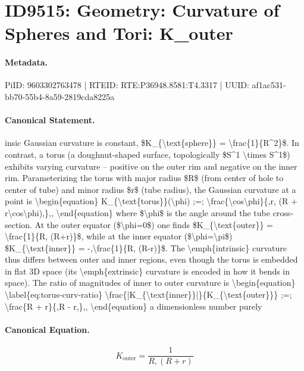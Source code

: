 \section*{ID9515: Geometry: Curvature of Spheres and Tori: K\_outer}
\paragraph{Metadata.}
PiID: 9603302763478 | RTEID: RTE:P36948.8581:T4.3317 | UUID: af1ac531-bb70-55b4-8a59-2819cda8225a

\paragraph{Canonical Statement.}
insic Gaussian curvature is constant, \$K\_\{\textbackslash{}text\{sphere\}\} = \textbackslash{}frac\{1\}\{R\textasciicircum{}2\}\$. In contrast, a torus (a doughnut-shaped surface, topologically \$S\textasciicircum{}1 \textbackslash{}times S\textasciicircum{}1\$) exhibits varying curvature – positive on the outer rim and negative on the inner rim. Parameterizing the torus with major radius \$R\$ (from center of hole to center of tube) and minor radius \$r\$ (tube radius), the Gaussian curvature at a point is \textbackslash{}begin\{equation\} K\_\{\textbackslash{}text\{torus\}\}(\textbackslash{}phi) ;=; \textbackslash{}frac\{\textbackslash{}cos\textbackslash{}phi\}\{,r, (R + r\textbackslash{}cos\textbackslash{}phi),\},, \textbackslash{}end\{equation\} where \$\textbackslash{}phi\$ is the angle around the tube cross-section. At the outer equator (\$\textbackslash{}phi=0\$) one finds \$K\_\{\textbackslash{}text\{outer\}\} = \textbackslash{}frac\{1\}\{R, (R+r)\}\$, while at the inner equator (\$\textbackslash{}phi=\textbackslash{}pi\$) \$K\_\{\textbackslash{}text\{inner\}\} = -,\textbackslash{}frac\{1\}\{R, (R-r)\}\$. The \textbackslash{}emph\{intrinsic\} curvature thus differs between outer and inner regions, even though the torus is embedded in flat 3D space (its \textbackslash{}emph\{extrinsic\} curvature is encoded in how it bends in space). The ratio of magnitudes of inner to outer curvature is \textbackslash{}begin\{equation\} \textbackslash{}label\{eq:torus-curv-ratio\} \textbackslash{}frac\{|K\_\{\textbackslash{}text\{inner\}\}|\}\{K\_\{\textbackslash{}text\{outer\}\}\} ;=; \textbackslash{}frac\{R + r\}\{,R - r,\},, \textbackslash{}end\{equation\} a dimensionless number purely

\paragraph{Canonical Equation.}
\[
K_{\text{outer}} = \frac{1}{R, (R+r)}
\]

